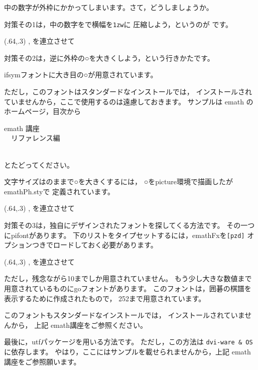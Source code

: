 \documentclass[fleqn,a4j]{jarticle}
\begin{document}
中の数字が外枠にかかってしまいます。さて，どうしましょうか。

対策その1は，中の数字をで横幅を\verb+1zw+に
圧縮しよう，というのが です。

\begin{showEx}(.64,.3){}
,  を連立させて
\end{showEx}

対策その2は，逆に外枠の○を大きくしよう，という行きかたです。

\textsf{ifsym}フォントに大き目の○が用意されています。

ただし，このフォントはスタンダードなインストールでは，
インストールされていませんから，ここで使用するのは遠慮しておきます。
サンプルは emath のホームページ，目次から
\begin{jquote}
emath 講座\\
　リファレンス編\\
\end{jquote}
とたどってください。

文字サイズはのままで○を大きくするには，
○を\textsf{picture}環境で描画したが\textsf{emathPh.sty}で
定義されています。

\begin{showEx}(.64,.3){}
,  を連立させて
\end{showEx}

対策その3は，独自にデザインされたフォントを探してくる方法です。
その一つに\textsf{pifont}があります。
下のリストをタイプセットするには，\textsf{emathFx}を\verb+[pzd]+
オプションつきでロードしておく必要があります。

\begin{showEx}(.64,.3){}
,  を連立させて
\end{showEx}

ただし，残念ながら10までしか用意されていません。
もう少し大きな数値まで用意されているものに\textsf{go}フォントがあります。
このフォントは，囲碁の棋譜を表示するために作成されたもので，
252まで用意されています。

このフォントもスタンダードなインストールでは，
インストールされていませんから，
上記 emath講座をご参照ください。

最後に，\textsf{utf}パッケージを用いる方法です。
ただし，この方法は \verb+dvi-ware & OS+ に依存します。
やはり，ここにはサンプルを載せられませんから，上記 emath講座をご参照願います。
\end{document}
